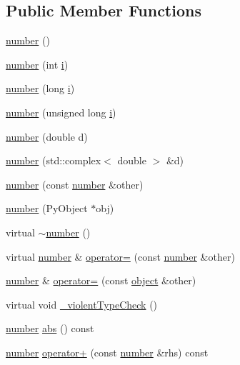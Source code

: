 \subsection*{Public Member Functions}
\begin{DoxyCompactItemize}
\item 
\hyperlink{classpy_1_1number_a46bb15f51e76170f0530616114a20da6}{number} ()
\item 
\hyperlink{classpy_1_1number_a313f4aaba4f772e1340534ba165c8f99}{number} (int \hyperlink{indexexpr_8h_aabd77643995707c185e95c8cb2782c81}{i})
\item 
\hyperlink{classpy_1_1number_acb06d5c786b60908df696e4154fdc4df}{number} (long \hyperlink{indexexpr_8h_aabd77643995707c185e95c8cb2782c81}{i})
\item 
\hyperlink{classpy_1_1number_a8b73dfe11a3a1fcac0dfd9f4b8d23e35}{number} (unsigned long \hyperlink{indexexpr_8h_aabd77643995707c185e95c8cb2782c81}{i})
\item 
\hyperlink{classpy_1_1number_a76dc0332b68f497c50321870ce1f1409}{number} (double d)
\item 
\hyperlink{classpy_1_1number_a7ffabe3463b498b72c9c23a764decbb1}{number} (std\+::complex$<$ double $>$ \&d)
\item 
\hyperlink{classpy_1_1number_a03706b88da9938657a888b5c85052734}{number} (const \hyperlink{classpy_1_1number}{number} \&other)
\item 
\hyperlink{classpy_1_1number_a62fa81687d8b1ceb1f4226b7cdc9fd5c}{number} (Py\+Object $\ast$obj)
\item 
virtual \hyperlink{classpy_1_1number_afb26ad9e2db43ca00e52396d6c1df9a4}{$\sim$number} ()
\item 
virtual \hyperlink{classpy_1_1number}{number} \& \hyperlink{classpy_1_1number_a0c28ab2b4e335b1bc925dcc4ca383c3d}{operator=} (const \hyperlink{classpy_1_1number}{number} \&other)
\item 
\hyperlink{classpy_1_1number}{number} \& \hyperlink{classpy_1_1number_a42293c1783657b9bd8c7e18039b95619}{operator=} (const \hyperlink{classpy_1_1object}{object} \&other)
\item 
virtual void \hyperlink{classpy_1_1number_a330baffa779f90e6307dfd4ba42e5a00}{\+\_\+violent\+Type\+Check} ()
\item 
\hyperlink{classpy_1_1number}{number} \hyperlink{classpy_1_1number_aa57adb83f2aa7164c8a3d66e782b8507}{abs} () const 
\item 
\hyperlink{classpy_1_1number}{number} \hyperlink{classpy_1_1number_ac55769d823a38ee26364f2f21fec22d1}{operator+} (const \hyperlink{classpy_1_1number}{number} \&rhs) const 

\end{DoxyCompactItemize}
